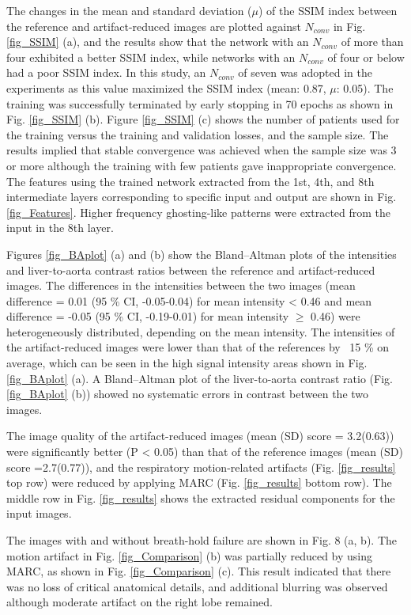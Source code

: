 \documentclass[num-refs]{wiley-article}
\begin{document}
The changes in the mean and standard deviation ($\mu$) of the SSIM index between the reference and artifact-reduced images are plotted against $N_{conv}$ in Fig. \ref{fig_SSIM} (a), and the results show that the network with an $N_{conv}$ of more than four exhibited a better SSIM index, while networks with an $N_{conv}$ of four or below had a poor SSIM index. In this study, an $N_{conv}$ of seven was adopted in the experiments as this value maximized the SSIM index (mean: 0.87, $\mu$: 0.05). The training was successfully terminated by early stopping in 70 epochs as shown in Fig. \ref{fig_SSIM} (b). Figure \ref{fig_SSIM} (c) shows the number of patients used for the training versus the training and validation losses, and the sample size. The results implied that stable convergence was achieved when the sample size was 3 or more although the training with few patients gave inappropriate convergence. The features using the trained network extracted from the 1st, 4th, and 8th intermediate layers corresponding to specific input and output are shown in Fig. \ref{fig_Features}. Higher frequency ghosting-like patterns were extracted from the input in the 8th layer.

Figures \ref{fig_BAplot} (a) and (b) show the Bland–Altman plots of the intensities and liver-to-aorta contrast ratios between the reference and artifact-reduced images. The differences in the intensities between the two images (mean difference = 0.01 (95 \% CI, -0.05-0.04) for mean intensity < 0.46 and mean difference = -0.05 (95 \% CI, -0.19-0.01) for mean intensity $\geq$ 0.46) were heterogeneously distributed, depending on the mean intensity. The intensities of the artifact-reduced images were lower than that of the references by ~15 \% on average, which can be seen in the high signal intensity areas shown in Fig. \ref{fig_BAplot} (a). A Bland–Altman plot of the liver-to-aorta contrast ratio (Fig. \ref{fig_BAplot} (b)) showed no systematic errors in contrast between the two images.

The image quality of the artifact-reduced images (mean (SD) score = 3.2(0.63)) were significantly better (P < 0.05) than that of the reference images (mean (SD) score =2.7(0.77)), and the respiratory motion-related artifacts (Fig. \ref{fig_results} top row) were reduced by applying MARC (Fig. \ref{fig_results} bottom row). The middle row in Fig. \ref{fig_results} shows the extracted residual components for the input images.

The images with and without breath-hold failure are shown in Fig. 8 (a, b). The motion artifact in Fig. \ref{fig_Comparison} (b) was partially reduced by using MARC, as shown in Fig. \ref{fig_Comparison} (c). This result indicated that there was no loss of critical anatomical details, and additional blurring was observed although moderate artifact on the right lobe remained.
\end{document}
